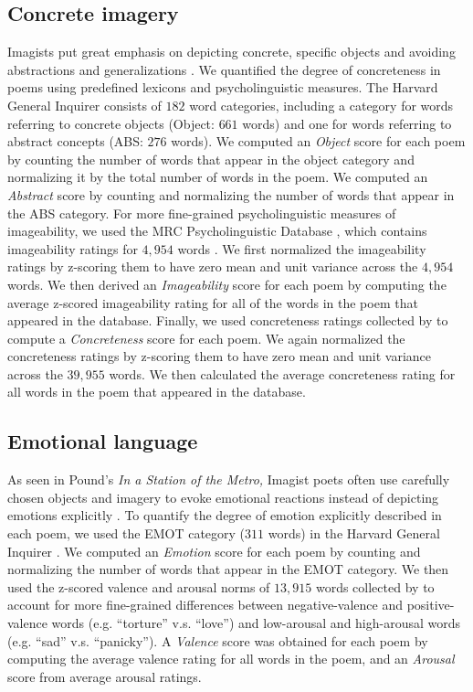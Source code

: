 \documentclass{book}
\begin{document}
\subsection{Concrete imagery}
Imagists put great emphasis on depicting concrete, specific objects and avoiding abstractions and generalizations \citep{aldington1916some}. We quantified the degree of concreteness in poems using predefined lexicons and psycholinguistic measures. The Harvard General Inquirer \citep{Inquirer+1966} consists of $182$ word categories, including a category for words referring to concrete objects (Object: $661$ words) and one for words referring to abstract concepts (ABS: $276$ words). We computed an \emph{Object} score for each poem by counting the number of words that appear in the object category and normalizing it by the total number of words in the poem. We computed an \emph{Abstract} score by counting and normalizing the number of words that appear in the ABS category. For more fine-grained psycholinguistic measures of imageability, we used the MRC Psycholinguistic Database \citep{wilson1988mrc}, which contains imageability ratings for $4,954$ words \citep{coltheart1981mrc}. We first normalized the imageability ratings by z-scoring them to have zero mean and unit variance across the $4,954$ words. We then derived an \emph{Imageability} score for each poem by computing the average z-scored imageability rating for all of the words in the poem that appeared in the database. Finally, we used concreteness ratings collected by \citet{brysbaert2013concreteness} to compute a \emph{Concreteness} score for each poem. We again normalized the concreteness ratings by z-scoring them to have zero mean and unit variance across the $39,955$ words. We then calculated the average concreteness rating for all words in the poem that appeared in the database. 
\subsection{Emotional language}
As seen in Pound's \emph{In a Station of the Metro,} Imagist poets often use carefully chosen objects and imagery to evoke emotional reactions instead of depicting emotions explicitly  \citep{hamilton2004toward}. To quantify the degree of emotion explicitly described in each poem, we used the EMOT category ($311$ words) in the Harvard General Inquirer \citep{Inquirer+1966}. We computed an \emph{Emotion} score for each poem by counting and normalizing the number of words that appear in the EMOT category. We then used the z-scored valence and arousal norms of $13,915$ words collected by \citet{warriner2013norms} to account for more fine-grained differences between negative-valence and positive-valence words (e.g. ``torture'' v.s. ``love'') and low-arousal and high-arousal words (e.g. ``sad'' v.s. ``panicky''). A \emph{Valence} score was obtained for each poem by computing the average valence rating for all words in the poem, and an \emph{Arousal} score from average arousal ratings.
\end{document}
